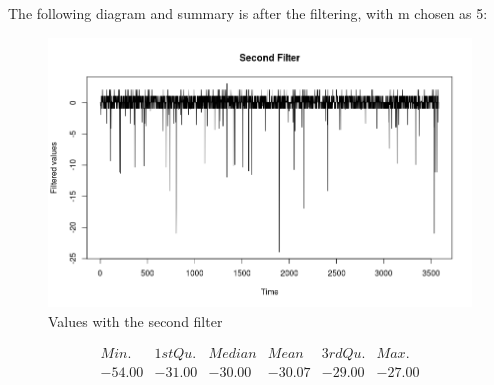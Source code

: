 The following diagram and summary is after the filtering, with m chosen as 5:


\begin{figure}[h!]
	\centering
		\includegraphics[width=.9\linewidth]{figures/SecondFilter.png}
		\caption{Values with the second filter \cite{secondzero}}\label{fig:SecondZero}
\end{figure}


\begin{figure}
$$
		\begin{array}{cccccc}
		Min.& 1st Qu. & Median & Mean & 3rd Qu. & Max.\\
		-54.00 & -31.00 & -30.00 & -30.07  & -29.00 &-27.00 
		\end{array}
		$$
\end{figure}
		          
		   